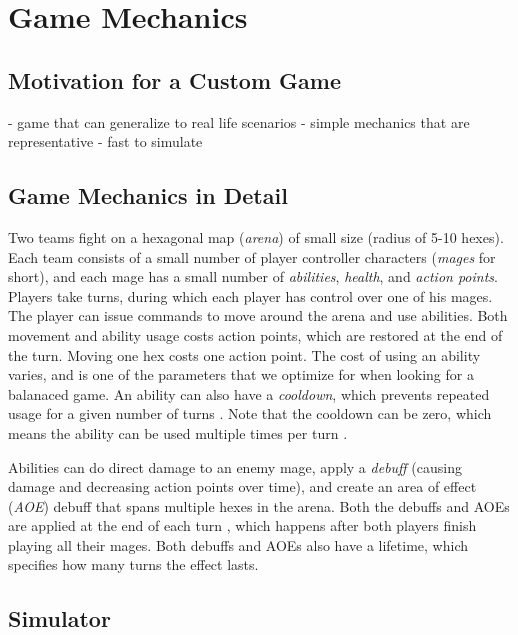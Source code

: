 \chapter{Game Mechanics}

\section{Motivation for a Custom Game}

- game that can generalize to real life scenarios
- simple mechanics that are representative
- fast to simulate

\section{Game Mechanics in Detail}

Two teams fight on a hexagonal map (\emph{arena}) of small size (radius of
5-10 hexes). Each team consists of a small number of player controller
characters (\emph{mages} for short), and each mage has a small number of
\emph{abilities}, \emph{health}, and \emph{action points}. Players take turns, during
which each player has control over one of his mages. The player can issue
commands to move around the arena and use abilities. Both movement and ability
usage costs action points, which are restored at the end of the turn.  Moving
one hex costs one action point. The cost of using an ability varies, and is one
of the parameters that we optimize for when looking for a balanaced game. An
ability can also have a \emph{cooldown}, which prevents repeated usage for a
given number of turns . Note that the cooldown can
be zero, which means the ability can be used multiple times per turn
.


Abilities can do direct damage to an enemy mage, apply a \emph{debuff} (causing
damage and decreasing action points over time), and create an area of effect
(\emph{AOE}) debuff that spans multiple hexes in the arena. Both the debuffs and
AOEs are applied at the end of each turn , which happens after both players finish playing all their mages.
Both debuffs and AOEs also have a lifetime, which specifies how many turns
 the effect lasts.

\section{Simulator}
